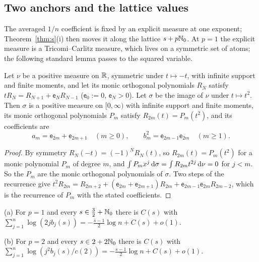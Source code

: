 \subsection{Two anchors and the lattice values}
The averaged $1/n$ coefficient is fixed by an explicit measure at one exponent; Theorem~\ref{thm:s}(i) then moves it
along the lattice $s+p\mathbb{N}_0$. At $p=1$ the explicit measure is a Tricomi--Carlitz measure, which lives on a symmetric set
of atoms; the following standard lemma passes to the squared variable.

\begin{lemma}\label{lem:quadratic}
Let $\nu$ be a positive measure on $\mathbb{R}$, symmetric under $t\mapsto-t$, with infinite support and finite moments, and
let its monic orthogonal polynomials $R_N$ satisfy $tR_N=R_{N+1}+\mathsf e_NR_{N-1}$ \textup{(}$\mathsf e_0:=0$,
$\mathsf e_N>0$\textup{)}. Let $\sigma$ be the image of $\nu$ under $t\mapsto t^2$. Then $\sigma$ is a positive measure on
$[0,\infty)$ with infinite support and finite moments, its monic orthogonal polynomials $P_m$ satisfy
$R_{2m}(t)=P_m(t^2)$, and its coefficients are
\[
  a_m=\mathsf e_{2m}+\mathsf e_{2m+1}\quad(m\ge0),\qquad b_m^2=\mathsf e_{2m-1}\mathsf e_{2m}\quad(m\ge1).
\]
\end{lemma}

\begin{proof}
By symmetry $R_N(-t)=(-1)^NR_N(t)$, so $R_{2m}(t)=P_m(t^2)$ for a monic polynomial $P_m$ of degree $m$, and
$\int P_mx^j\,\mathrm{d}\sigma=\int R_{2m}t^{2j}\,\mathrm{d}\nu=0$ for $j<m$. So the $P_m$ are the monic orthogonal polynomials of
$\sigma$. Two steps of the recurrence give $t^2R_{2m}=R_{2m+2}+(\mathsf e_{2m}+\mathsf e_{2m+1})R_{2m}+\mathsf
e_{2m-1}\mathsf e_{2m}R_{2m-2}$, which is the recurrence of $P_m$ with the stated coefficients.
\end{proof}

\begin{corollary}\label{cor:lattice}
\textup{(a)} For $p=1$ and every $s\in\frac32+\mathbb{N}_0$ there is $C(s)$ with
$\sum_{j=1}^n\log(2jb_j(s))=-\frac{s-1}2\log n+C(s)+o(1)$.

\textup{(b)} For $p=2$ and every $s\in2+2\mathbb{N}_0$ there is $C(s)$ with
$\sum_{j=1}^n\log(j^2b_j(s)/c(2))=-\frac{s-1}2\log n+C(s)+o(1)$.
\end{corollary}


